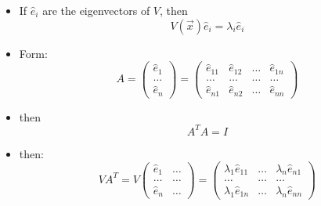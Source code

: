 \begin{itemize}
      \item If $\hat{e}_i$ are the eigenvectors of $V$, then
            \[ V (\vec{x})\hat{e}_i = \lambda_i \hat{e}_i \]
      \item Form:
            \[ A = \begin{pmatrix}
                        \hat{e}_1 \\
                        \ldots    \\
                        \hat{e}_n
                  \end{pmatrix}
                  = \begin{pmatrix}
                        \hat{e}_{11} & \hat{e}_{12} & \ldots & \hat{e}_{1n} \\
                        \ldots       & \ldots       & \ldots & \ldots       \\
                        \hat{e}_{n1} & \hat{e}_{n2} & \ldots & \hat{e}_{nn}
                  \end{pmatrix} \]
      \item then
            \[ A^T A = I \]
      \item then:
            \[ V A^T = V \begin{pmatrix}
                        \hat{e}_1 & \ldots \\
                        \ldots    & \ldots \\
                        \hat{e}_n & \ldots
                  \end{pmatrix} = \begin{pmatrix}
                        \lambda_1 \hat{e}_{11} & \ldots & \lambda_n \hat{e}_{n1} \\
                        \ldots                 & \ldots & \ldots                 \\
                        \lambda_1 \hat{e}_{1n} & \ldots & \lambda_n \hat{e}_{nn}
                  \end{pmatrix} \]


\end{itemize}
